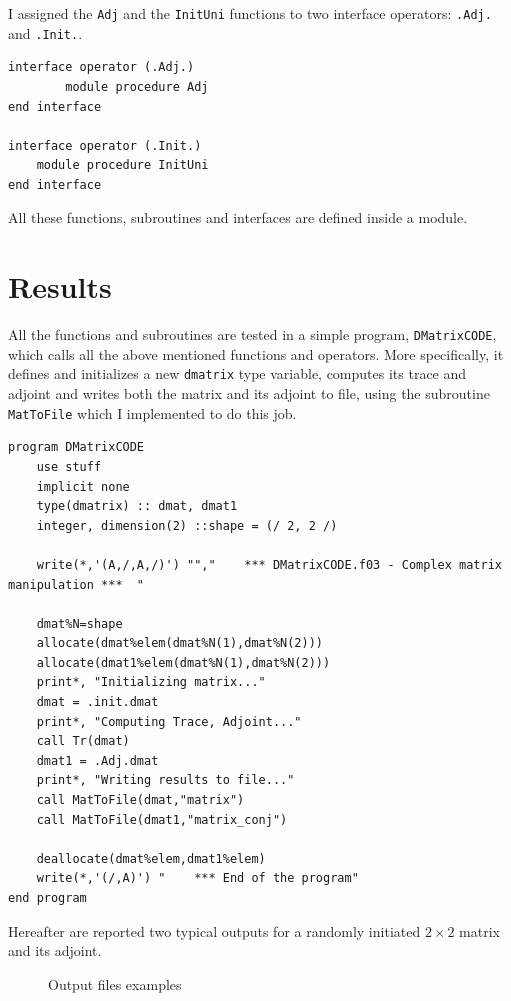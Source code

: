 \documentclass[a4paper]{article}
\begin{document}
\noindent I assigned the \lstinline{Adj} and the \lstinline{InitUni} functions to two interface operators: \lstinline{.Adj.} and \lstinline{.Init.}.
\begin{lstlisting}
interface operator (.Adj.)
        module procedure Adj
end interface 

interface operator (.Init.)
    module procedure InitUni
end interface
\end{lstlisting}

All these functions, subroutines and interfaces are defined inside a module.

\section*{Results}
All the functions and subroutines are tested in a simple program, \lstinline{DMatrixCODE}, which calls all the above mentioned functions and operators.
More specifically, it defines and initializes a new \lstinline{dmatrix} type variable, computes its trace and adjoint and writes both the matrix and its adjoint to file, using the subroutine \lstinline{MatToFile} which I implemented to do this job.
\begin{lstlisting}
program DMatrixCODE
    use stuff
    implicit none
    type(dmatrix) :: dmat, dmat1
    integer, dimension(2) ::shape = (/ 2, 2 /)

    write(*,'(A,/,A,/)') "","    *** DMatrixCODE.f03 - Complex matrix manipulation ***  "
    
    dmat%N=shape
    allocate(dmat%elem(dmat%N(1),dmat%N(2)))
    allocate(dmat1%elem(dmat%N(1),dmat%N(2)))
    print*, "Initializing matrix..."
    dmat = .init.dmat
    print*, "Computing Trace, Adjoint..."
    call Tr(dmat)
    dmat1 = .Adj.dmat
    print*, "Writing results to file..."
    call MatToFile(dmat,"matrix")
    call MatToFile(dmat1,"matrix_conj")
    
    deallocate(dmat%elem,dmat1%elem)
    write(*,'(/,A)') "    *** End of the program"
end program
\end{lstlisting}

\noindent Hereafter are reported two typical outputs for a randomly initiated $2\times2$ matrix and its adjoint.

\begin{figure}[h!]
\centering
{}

\vspace{-1cm}
\vspace{-.5cm}
\caption{Output files examples}
\end{figure}
\end{document}
